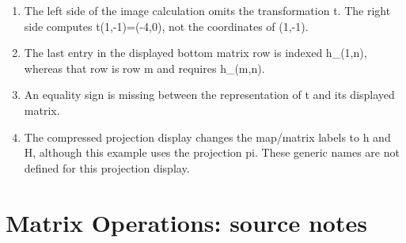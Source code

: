 \begin{enumerate}
\item The left side of the image calculation omits the transformation t. The right side computes t(1,-1)=(-4,0), not the coordinates of (1,-1).
\item The last entry in the displayed bottom matrix row is indexed h\_(1,n), whereas that row is row m and requires h\_(m,n).
\item An equality sign is missing between the representation of t and its displayed matrix.
\item The compressed projection display changes the map/matrix labels to h and H, although this example uses the projection pi. These generic names are not defined for this projection display.
\end{enumerate}
\section*{Matrix Operations: source notes}
